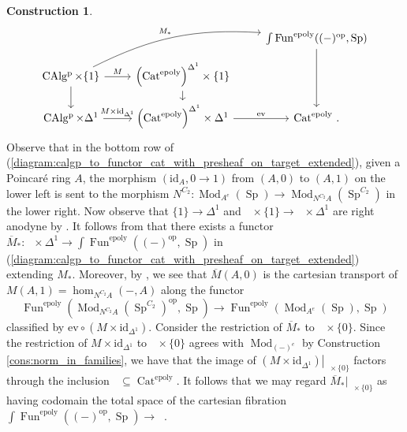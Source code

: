 \documentclass{article}
\DeclareMathOperator{\CAlgp}{CAlg^p} %
\DeclareMathOperator{\Cat}{Cat} %
\DeclareMathOperator{\Catex}{\Cat_\infty^{ex}} %
\DeclareMathOperator{\Fun}{Fun} %
\DeclareMathOperator{\Mod}{Mod} %
\DeclareMathOperator{\Spectra}{Sp} %
\newcommand{\op}{\mathrm{op}}
\newcommand{\epoly}{\mathrm{epoly}}
\theoremstyle{definition}
\newtheorem{construction}[equation]{Construction}
\newcommand{\Lucy}[1]{\todo[color=cyan!30]{\footnotesize L: #1}}
\begin{document}
\begin{construction}
\begin{equation}
    \begin{tikzcd}[row sep=small]
        & & \int \Fun^{\epoly}( (-)^\op, \Spectra) \ar[dd] \\
        \CAlgp \times \{1\} \ar[r,"M"] \ar[rru,bend left=15,"{M_*}"] \ar[d] & \left(\Cat^\epoly\right)^{\Delta^1} \times \{1\} \ar[d] &  \\
        \CAlgp \times \Delta^1 \ar[r,"{M \times \mathrm{id}_{\Delta^1}}"] & \left(\Cat^\epoly\right)^{\Delta^1} \times \Delta^1 \ar[r,"{\mathrm{ev}}"] & \Cat^\epoly  \,.
    \end{tikzcd}
    \end{equation}
    Observe that in the bottom row of (\ref{diagram:calgp_to_functor_cat_with_presheaf_on_target_extended}), given a Poincaré ring $ A $, the morphism $ (\mathrm{id}_A, 0\to 1) $ from $ (A,0) $ to $ (A, 1) $ on the lower left is sent to the morphism $ N^{C_2} \colon \Mod_{A^e}(\Spectra) \to \Mod_{N^{C_2}A}\left(\Spectra^{C_2} \right) $ in the lower right. 
    Now observe that $ \{1\} \to \Delta^1 $ and $ \CAlgp \times \{1\} \to \CAlgp \times \Delta^1 $ are right anodyne by \cite[Corollary 2.1.2.7]{HTT}. 
    It follows from \cites[Corollary 2.4.2.5]{HTT}[\href{https://kerodon.net/tag/01VF}{Tag 01VF} Theorem 5.2.1.1(1)]{kerodon} that there exists a functor $ \overline{M}_* \colon \CAlgp \times \Delta^1 \to \int \Fun^\epoly\left((-)^\op,\Spectra\right) $ in (\ref{diagram:calgp_to_functor_cat_with_presheaf_on_target_extended}) extending $ M_* $. 
    Moreover, by \cite[\href{https://kerodon.net/tag/01VF}{Tag 01VF} Theorem 5.2.1.1(2)]{kerodon}, we see that $ \overline{M}(A,0) $ is the cartesian transport of $ M (A, 1) = \hom_{N^{C_2}A}(-,A) $ along the functor $$ \Fun^\epoly\left(\Mod_{N^{C_2} A}\left(\Spectra^{C_2}\right) ^\op, \Spectra\right) \to \Fun^\epoly\left(\Mod_{A^e}\left(\Spectra\right),\Spectra\right) $$ classified by $ \mathrm{ev} \circ \left(M \times \mathrm{id}_{\Delta^1}\right) $. 
    Consider the restriction of $ \overline{M}_* $ to $ \CAlgp \times \{0\} $. 
    Since the restriction of $ M \times \mathrm{id}_{\Delta^1} $ to $ \CAlgp \times \{0\} $ agrees with $ \Mod_{(-)^e} $ by Construction \ref{cons:norm_in_families}, we have that the image of $ \left.\left( M \times \mathrm{id}_{\Delta^1} \right)\right|_{\CAlgp \times \{0\}} $ factors through the inclusion $ \Catex \subseteq \Cat^\epoly $. \Lucy{todo: size issue} 
    It follows that we may regard $ \overline{M}_*|_{\CAlgp \times \{0\}} $ as having codomain the total space of the cartesian fibration $ \int \Fun^\epoly\left((-)^\op,\Spectra\right) \to \Catex $. 


\end{construction}
\end{document}
